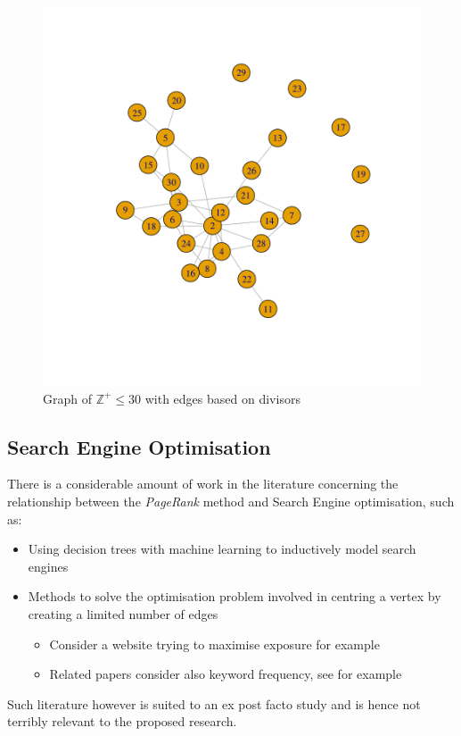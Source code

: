 \documentclass[11pt]{article}
\begin{document}
\begin{figure}[htbp]
\centering
\includegraphics[width=.9\linewidth]{pure-math-adj-graph.png}
\caption{\label{pure-math-graph}Graph of \(\mathbb{Z}^+ \leq 30\) with edges based on divisors}
\end{figure}


\subsection{Search Engine Optimisation}
\label{sec:org6a5f93a}
There is a considerable amount of work in the literature concerning the
relationship between the \emph{PageRank} method and Search Engine optimisation, such
as:

\begin{itemize}
\item Using decision trees with machine learning to inductively model search engines \cite{pringleWhatTallPoppy1998}
\item Methods to solve the optimisation problem involved in centring a vertex by
creating a limited number of edges
\cite{kamvarAdaptiveMethodsComputation2004b,dekerchoveMaximizingPageRankOutlinks2008}
\begin{itemize}
\item Consider a website trying to maximise exposure for example
\item Related papers consider also keyword frequency, see for example \cite{zhangImpactWebpageContent2005}
\end{itemize}
\end{itemize}

Such literature however is suited to an ex post facto study and is hence not
terribly relevant to the proposed research.
\end{document}
